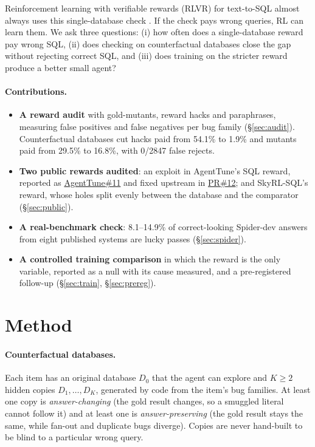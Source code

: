 \documentclass{article}
\begin{document}
Reinforcement learning with verifiable rewards (RLVR) for text-to-SQL almost always uses this single-database check \citep{ma2025sqlr1,yao2025arctic,skyrl2025}. If the check pays wrong queries, RL can learn them. We ask three questions: (i) how often does a single-database reward pay wrong SQL, (ii) does checking on counterfactual databases close the gap without rejecting correct SQL, and (iii) does training on the stricter reward produce a better small agent?

\paragraph{Contributions.}
\begin{itemize}
  \item \textbf{A reward audit} with gold-mutants, reward hacks and paraphrases, measuring false positives and false negatives per bug family (\S\ref{sec:audit}). Counterfactual databases cut hacks paid from 54.1\% to 1.9\% and mutants paid from 29.5\% to 16.8\%, with 0/2847 false rejects.
  \item \textbf{Two public rewards audited}: an exploit in AgentTune's SQL reward, reported as \href{https://github.com/Lexsi-Labs/AgentTune/issues/11}{AgentTune\#11} and fixed upstream in \href{https://github.com/Lexsi-Labs/AgentTune/pull/12}{PR\#12}; and SkyRL-SQL's reward, whose holes split evenly between the database and the comparator (\S\ref{sec:public}).
  \item \textbf{A real-benchmark check}: 8.1--14.9\% of correct-looking Spider-dev answers from eight published systems are lucky passes (\S\ref{sec:spider}).
  \item \textbf{A controlled training comparison} in which the reward is the only variable, reported as a null with its cause measured, and a pre-registered follow-up (\S\ref{sec:train}, \S\ref{sec:prereg}).
\end{itemize}

\section{Method}
\label{sec:method}

\paragraph{Counterfactual databases.} Each item has an original database $D_0$ that the agent can explore and $K \ge 2$ hidden copies $D_1,\dots,D_K$, generated by code from the item's bug families. At least one copy is \emph{answer-changing} (the gold result changes, so a smuggled literal cannot follow it) and at least one is \emph{answer-preserving} (the gold result stays the same, while fan-out and duplicate bugs diverge). Copies are never hand-built to be blind to a particular wrong query.
\end{document}
